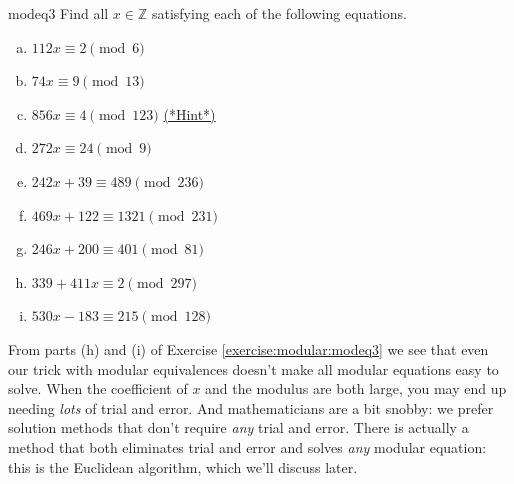 \begin{exercise}{modeq3}
Find all $x \in {\mathbb Z}$ satisfying each of the following equations.
\begin{multicols}{2}
\begin{enumerate}[(a)]
\item
$112x \equiv 2 \pmod{ 6}$
\item
$74x \equiv 9 \pmod{ 13}$
\item
$856x \equiv 4 \pmod{ 123}$ 
\hyperref[sec:modular_arithmetic:hints]{(*Hint*)}
\item
$272x \equiv 24 \pmod{ 9}$
\item
$242x + 39 \equiv 489 \pmod{236}$
\item
$469x + 122 \equiv 1321 \pmod{ 231}$
\item
$246x + 200 \equiv 401 \pmod{ 81}$
\item
$339 + 411x \equiv 2 \pmod{ 297}$
\item
$530x - 183 \equiv 215 \pmod{ 128}$ 
\end{enumerate}
\end{multicols}
\end{exercise}

From parts (h) and (i) of Exercise \ref{exercise:modular:modeq3} we see that even our trick with modular equivalences doesn't make all modular equations easy to solve.  When the coefficient of $x$ and the modulus are both large, you may end up needing \emph{lots} of trial and error.  And mathematicians are a bit snobby: we prefer solution methods that don't require \emph{any} trial and error.  There is actually a method that both eliminates trial and error and solves \emph{any} modular equation: this is the Euclidean algorithm, which we'll discuss later.




